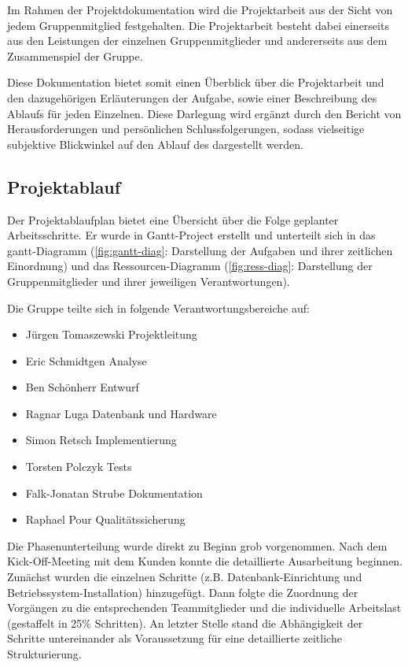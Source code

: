 Im Rahmen der Projektdokumentation wird die Projektarbeit aus der Sicht von jedem Gruppenmitglied festgehalten. Die Projektarbeit besteht dabei einerseits aus den Leistungen der einzelnen Gruppenmitglieder und andererseits aus dem Zusammenspiel der Gruppe.

Diese Dokumentation bietet somit einen Überblick über die Projektarbeit und den dazugehörigen Erläuterungen der Aufgabe, sowie einer Beschreibung des Ablaufs für jeden Einzelnen. Diese Darlegung wird ergänzt durch den Bericht von Herausforderungen und persönlichen Schlussfolgerungen, sodass vielseitige subjektive Blickwinkel auf den Ablauf des dargestellt werden.

\subsection*{Projektablauf}

Der Projektablaufplan bietet eine Übersicht über die Folge geplanter Arbeitsschritte. Er wurde in Gantt-Project erstellt und unterteilt sich in das gantt-Diagramm (\autoref{fig:gantt-diag}: Darstellung der Aufgaben und ihrer zeitlichen Einordnung) und das Ressourcen-Diagramm (\autoref{fig:ress-diag}: Darstellung der Gruppenmitglieder und ihrer jeweiligen Verantwortungen). 

Die Gruppe teilte sich in folgende Verantwortungsbereiche auf:
\begin{itemize}
\item Jürgen Tomaszewski		 Projektleitung
\item Eric Schmidtgen				 Analyse
\item Ben Schönherr					 Entwurf
\item Ragnar Luga						 Datenbank und Hardware
\item Simon Retsch					 Implementierung
\item Torsten Polczyk				 Tests
\item Falk-Jonatan Strube		 Dokumentation
\item Raphael Pour					 Qualitätssicherung
\end{itemize}

Die Phasenunterteilung wurde direkt zu Beginn grob vorgenommen. Nach dem Kick-Off-Meeting mit dem Kunden konnte die detaillierte Ausarbeitung beginnen. Zunächst wurden die einzelnen Schritte (z.B. Datenbank-Einrichtung und Betriebssystem-Installation) hinzugefügt. Dann folgte die Zuordnung der Vorgängen zu die entsprechenden Teammitglieder und die individuelle Arbeitslast (gestaffelt in 25\% Schritten). An letzter Stelle stand die Abhängigkeit der Schritte untereinander als Voraussetzung für eine detaillierte zeitliche Strukturierung.

